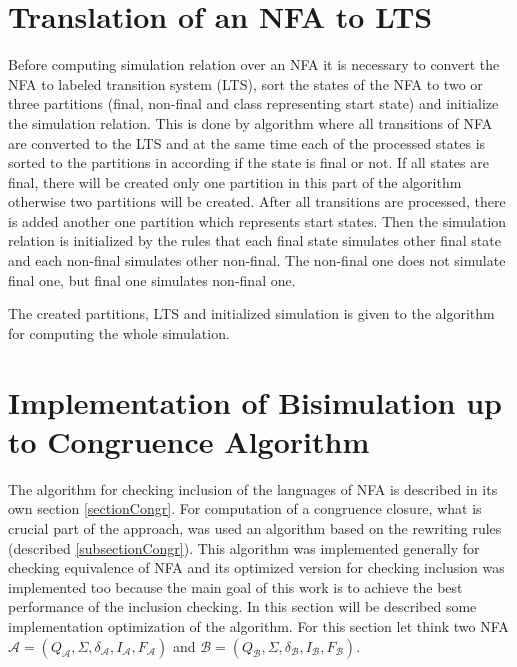 \section{Translation of an NFA to LTS}
Before computing simulation relation over an NFA it is necessary to convert the NFA to labeled transition system (LTS), sort the states of the NFA to
two or three partitions (final, non-final and class representing start state) and initialize the simulation relation. This is done by algorithm where 
all transitions of NFA are converted to the LTS and at the same time each of the processed states is sorted to the partitions in according if
the state is final or not. If all states are final, there will be created only one partition in this part of the algorithm otherwise two partitions will
be created. After all transitions are processed, there is added another one partition which represents start states. Then the simulation relation is initialized
by the rules that each final state simulates other final state and each non-final simulates other non-final. The non-final one does not simulate final one, but 
final one simulates non-final one.

The created partitions, LTS and initialized simulation is given to the algorithm for computing the whole simulation. 

\section{Implementation of Bisimulation up to Congruence Algorithm}
\label{sectionCongrImpl}
The algorithm for checking inclusion of the languages of NFA is described in its own section \ref{sectionCongr}. For computation of a congruence closure, 
what is crucial part of the approach, was used an algorithm based on the rewriting rules (described \ref{subsectionCongr}). 
This algorithm was implemented generally for checking equivalence of NFA and its optimized version for checking inclusion was implemented too 
because the main goal of this work is to achieve the best performance of the inclusion checking. In this section will be described some implementation
optimization of the algorithm. For this section let think two NFA $\mathcal{A}=(Q_\mathcal{A},\Sigma,\delta_\mathcal{A},I_\mathcal{A},F_\mathcal{A})$ and
$\mathcal{B}=(Q_\mathcal{B},\Sigma,\delta_\mathcal{B},I_\mathcal{B},F_\mathcal{B})$.


